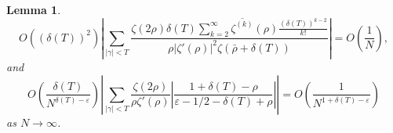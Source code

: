 \documentclass[11pt,article]{amsart}
\numberwithin{equation}{section}
\newtheorem{lemma}{Lemma}
\numberwithin{equation}{section}
\numberwithin{lemma}{section}
\numberwithin{prop}{section}
\begin{document}
\begin{lemma}
\begin{equation}
O\left(\left(\delta(T)\right)^{2}\right)\left|\sum_{\left|\gamma\right|<T}\frac{\zeta(2\rho)\delta(T)\sum_{k=2}^{\infty}\overline{\zeta^{(k)}}(\rho)\frac{\left(\delta(T)\right)^{k-2}}{k!}}{\rho\left|\zeta'(\rho)\right|^{2}\zeta\left(\bar{\rho}+\delta(T)\right)}\right|=O\left(\frac{1}{N}\right), \label{probterm42}
\end{equation}
and 
\begin{equation}
O\left(\frac{\delta(T)}{N^{\delta(T)-\varepsilon}}\right)\left|\sum_{\left|\gamma\right|<T}\frac{\zeta(2\rho)}{\rho\zeta'(\rho)}\left|\frac{1+\delta(T)-\rho}{\varepsilon-1/2-\delta(T)+\rho}\right|\right|=O\left(\frac{1}{N^{1+\delta(T)-\varepsilon}}\right) \label{probterm52}
\end{equation}
as $N\rightarrow \infty$. 
\label{delta lemma2}
\end{lemma}
\end{document}
